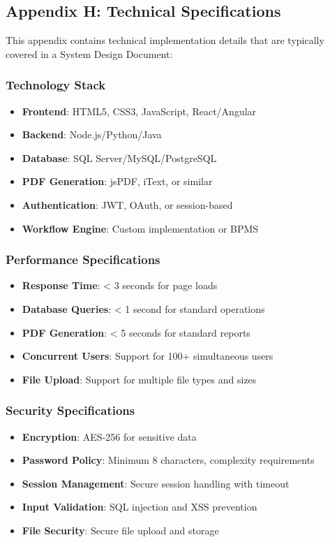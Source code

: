\documentclass[12pt,a4paper]{article}
\begin{document}
\subsection{Appendix H: Technical Specifications}
This appendix contains technical implementation details that are typically covered in a System Design Document:

\subsubsection{Technology Stack}
\begin{itemize}
    \item \textbf{Frontend}: HTML5, CSS3, JavaScript, React/Angular
    \item \textbf{Backend}: Node.js/Python/Java
    \item \textbf{Database}: SQL Server/MySQL/PostgreSQL
    \item \textbf{PDF Generation}: jsPDF, iText, or similar
    \item \textbf{Authentication}: JWT, OAuth, or session-based
    \item \textbf{Workflow Engine}: Custom implementation or BPMS
\end{itemize}

\subsubsection{Performance Specifications}
\begin{itemize}
    \item \textbf{Response Time}: < 3 seconds for page loads
    \item \textbf{Database Queries}: < 1 second for standard operations
    \item \textbf{PDF Generation}: < 5 seconds for standard reports
    \item \textbf{Concurrent Users}: Support for 100+ simultaneous users
    \item \textbf{File Upload}: Support for multiple file types and sizes
\end{itemize}

\subsubsection{Security Specifications}
\begin{itemize}
    \item \textbf{Encryption}: AES-256 for sensitive data
    \item \textbf{Password Policy}: Minimum 8 characters, complexity requirements
    \item \textbf{Session Management}: Secure session handling with timeout
    \item \textbf{Input Validation}: SQL injection and XSS prevention
    \item \textbf{File Security}: Secure file upload and storage
\end{itemize}
\end{document}
